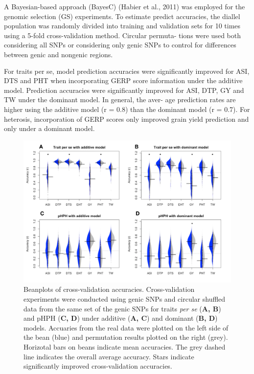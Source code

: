 \documentclass[9pt,twocolumn,twoside]{gsajnl}
\begin{document}
A Bayesian-based approach (BayesC) (Habier et al., 2011) was employed for the genomic selection (GS) experiments. To estimate predict accuracies, the diallel population was randomly divided into training and validation sets for 10 times using a 5-fold cross-validation method. Circular permuta- tions were used both considering all SNPs or considering only genic SNPs to control for differences between genic and nongenic regions.

For traits per se, model prediction accuracies were significantly improved for ASI, DTS and PHT when incorporating GERP score information under the additive model. Prediction accuracies were significantly improved for ASI, DTP, GY and TW under the dominant model. In general, the aver- age prediction rates are higher using the additive model (r = 0.8) than the dominant model (r = 0.7). For heterosis, incorporation of GERP scores only improved grain yield prediction and only under a dominant model.

\begin{figure}[htbp]
\centering
\includegraphics[width=\linewidth]{cvres.pdf}
\caption{Beanplots of cross-validation accuracies. Cross-validation experiments were conducted using genic SNPs and circular shuffled data from the same set of the genic SNPs for traits \emph{per se} (\textbf{A, B}) and pHPH (\textbf{C, D}) under additive (\textbf{A, C}) and dominant (\textbf{B, D}) models. Accuaries from the real data were plotted on the left side of the bean (blue) and permutation results plotted on the right (grey). Horizotal bars on beans indicate mean accuracies. The grey dashed line indicates the overall average accuracy. Stars indicate significantly improved cross-validation accuracies.}
\label{fig:beanplot}
\end{figure}
\end{document}

